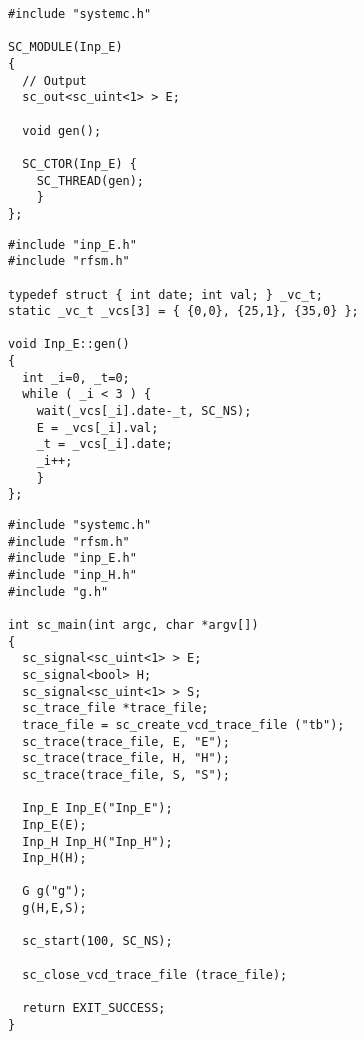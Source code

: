 \begin{lstlisting}[language=systemc,frame=single,numbers=none,basicstyle=\small,caption=File inp_E.h]
#include "systemc.h"

SC_MODULE(Inp_E)
{
  // Output
  sc_out<sc_uint<1> > E;

  void gen();

  SC_CTOR(Inp_E) {
    SC_THREAD(gen);
    }
};
\end{lstlisting}

\begin{lstlisting}[language=systemc,frame=single,numbers=none,basicstyle=\small,caption=File inp_E.cpp]
#include "inp_E.h"
#include "rfsm.h"

typedef struct { int date; int val; } _vc_t;
static _vc_t _vcs[3] = { {0,0}, {25,1}, {35,0} };

void Inp_E::gen()
{
  int _i=0, _t=0;
  while ( _i < 3 ) {
    wait(_vcs[_i].date-_t, SC_NS);
    E = _vcs[_i].val;
    _t = _vcs[_i].date;
    _i++;
    }
};
\end{lstlisting}

\begin{lstlisting}[language=systemc,frame=single,numbers=none,basicstyle=\small,caption=File tb.cpp]
#include "systemc.h"
#include "rfsm.h"
#include "inp_E.h"
#include "inp_H.h"
#include "g.h"

int sc_main(int argc, char *argv[])
{
  sc_signal<sc_uint<1> > E;
  sc_signal<bool> H;
  sc_signal<sc_uint<1> > S;
  sc_trace_file *trace_file;
  trace_file = sc_create_vcd_trace_file ("tb");
  sc_trace(trace_file, E, "E");
  sc_trace(trace_file, H, "H");
  sc_trace(trace_file, S, "S");

  Inp_E Inp_E("Inp_E");
  Inp_E(E);
  Inp_H Inp_H("Inp_H");
  Inp_H(H);

  G g("g");
  g(H,E,S);

  sc_start(100, SC_NS);

  sc_close_vcd_trace_file (trace_file);

  return EXIT_SUCCESS;
}
\end{lstlisting}

